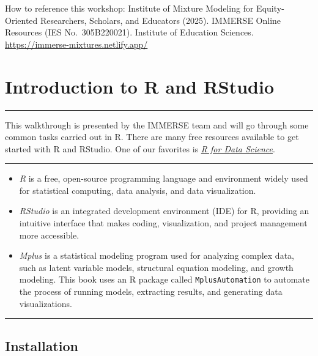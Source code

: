 \documentclass[
]{book}
\begin{document}
How to reference this workshop: Institute of Mixture Modeling for Equity-Oriented Researchers, Scholars, and Educators (2025).
IMMERSE Online Resources (IES No.~305B220021).
Institute of Education Sciences.
\url{https://immerse-mixtures.netlify.app/}

\chapter{Introduction to R and RStudio}\label{introduction-to-r-and-rstudio}

\begin{center}\rule{0.5\linewidth}{0.5pt}\end{center}

This walkthrough is presented by the IMMERSE team and will go through some common tasks carried out in R.
There are many free resources available to get started with R and RStudio.
One of our favorites is \href{https://r4ds.had.co.nz/}{\emph{R for Data Science}}.

\begin{center}\rule{0.5\linewidth}{0.5pt}\end{center}

\begin{itemize}
\item
  \emph{R}\citep{rcore2017} is a free, open-source programming language and environment widely used for statistical computing, data analysis, and data visualization.
\item
  \emph{RStudio}\citep{rstudio2020} is an integrated development environment (IDE) for R, providing an intuitive interface that makes coding, visualization, and project management more accessible.
\item
  \emph{Mplus}\citep{muthen2017} is a statistical modeling program used for analyzing complex data, such as latent variable models, structural equation modeling, and growth modeling.
  This book uses an R package called \texttt{MplusAutomation} to automate the process of running models, extracting results, and generating data visualizations.
\end{itemize}

\begin{center}\rule{0.5\linewidth}{0.5pt}\end{center}

\section{Installation}\label{installation}
\end{document}
